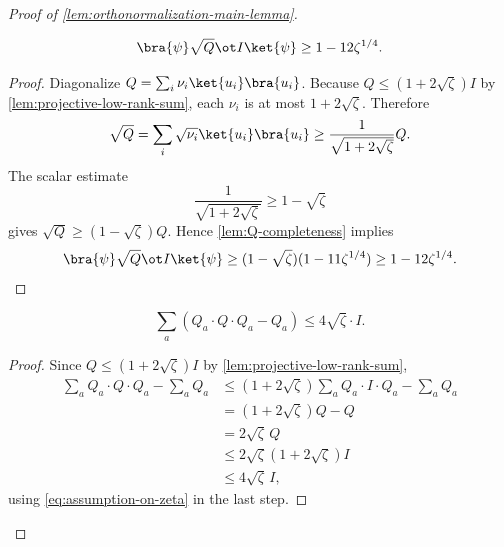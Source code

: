 \begin{proof}[Proof of \ref{lem:orthonormalization-main-lemma}]
	\begin{lemma}\label{lem:sqrt-Q-completeness}
		\leanok
		\begin{equation*}
			\bra{\psi} \sqrt{Q} \ot I \ket{\psi}
			\geq
			1 - 12 \zeta^{1/4}.
		\end{equation*}
	\end{lemma}
	\begin{proof}
		\leanok
		Diagonalize $Q=\sum_i \nu_i \ket{u_i}\bra{u_i}$. Because $Q \leq (1+2\sqrt{\zeta})I$ by \ref{lem:projective-low-rank-sum}, each $\nu_i$ is at most $1+2\sqrt{\zeta}$. Therefore
		\[
			\sqrt{Q}
			=
			\sum_i \sqrt{\nu_i}\ket{u_i}\bra{u_i}
			\geq
			\frac{1}{\sqrt{1+2\sqrt{\zeta}}} Q.
		\]
		The scalar estimate
		\[
			\frac{1}{\sqrt{1+2\sqrt{\zeta}}} \geq 1-\sqrt{\zeta}
		\]
		gives $\sqrt{Q} \geq (1-\sqrt{\zeta})Q$. Hence \ref{lem:Q-completeness} implies
		\[
			\bra{\psi} \sqrt{Q} \ot I \ket{\psi}
			\geq
			(1-\sqrt{\zeta})(1-11\zeta^{1/4})
			\geq
			1-12\zeta^{1/4}.
		\]
	\end{proof}

	\begin{lemma}\label{lem:q-almost-projective}
		\leanok
		\begin{equation*}
			\sum_a (Q_a \cdot Q \cdot Q_a - Q_a) \leq 4\sqrt{\zeta} \cdot I.
		\end{equation*}
	\end{lemma}
	\begin{proof}
		\leanok
		Since $Q \leq (1+2\sqrt{\zeta})I$ by \ref{lem:projective-low-rank-sum},
		\begin{align*}
			\sum_a Q_a \cdot Q \cdot Q_a - \sum_a Q_a
			 & \leq
			(1+2\sqrt{\zeta}) \sum_a Q_a \cdot I \cdot Q_a - \sum_a Q_a \\
			 & =
			(1+2\sqrt{\zeta})Q - Q                                      \\
			 & =
			2\sqrt{\zeta}\,Q                                            \\
			 & \leq
			2\sqrt{\zeta}(1+2\sqrt{\zeta})I                             \\
			 & \leq
			4\sqrt{\zeta}\,I,
		\end{align*}
		using \ref{eq:assumption-on-zeta} in the last step.
	\end{proof}


\end{proof}

